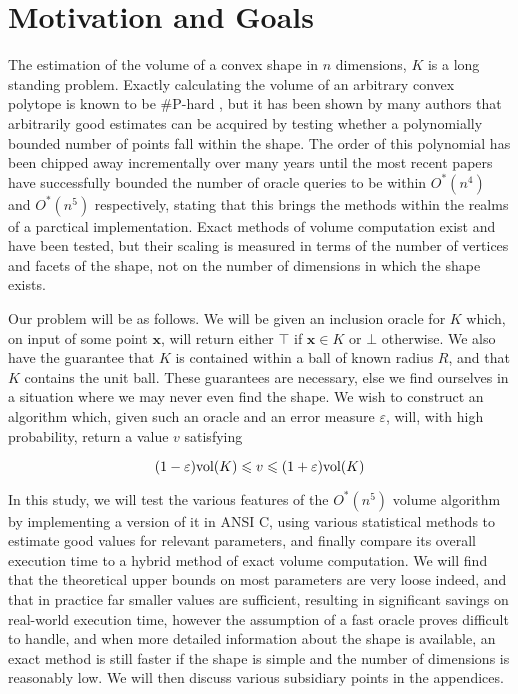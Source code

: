 \section{Motivation and Goals}

The estimation of the volume of a convex shape in $n$ dimensions, $K$ is a long standing problem. Exactly calculating the volume of an arbitrary convex polytope is known to be \#P-hard \cite{Dyer88}, but it has been shown by many authors \cite{Dyer95, Kannan97, Lovasz03}
that arbitrarily good estimates can be acquired by testing whether a polynomially bounded number of points fall within the shape. The order of this polynomial has been chipped away incrementally over many years until the most recent papers have successfully bounded the number of oracle queries to be within $O^{*}(n^4)$ and $O^{*}(n^5)$ respectively, stating that this brings the methods within the realms of a parctical implementation. Exact methods of volume computation exist and have been tested, but their scaling is measured in terms of the number of vertices and facets of the shape, not on the number of dimensions in which the shape exists. 

Our problem will be as follows. We will be given an inclusion oracle for $K$ which, on input of some point $\bm{x}$, will return either $\top$ if $\bm{x} \in K$ or $\bot$ otherwise. We also have the guarantee that $K$ is contained within a ball of known radius $R$, and that $K$ contains the unit ball. These guarantees are necessary, else we find ourselves in a situation where we may never even find the shape. We wish to construct an algorithm which, given such an oracle and an error measure $\varepsilon$, will, with high probability, return a value $v$ satisfying

$$
(1-\varepsilon)\mbox{vol}(K) \leqslant v \leqslant (1+\varepsilon)\mbox{vol}(K)
$$

In this study, we will test the various features of the $O^{*}(n^5)$ volume algorithm by implementing a version of it in ANSI C, using various statistical methods to estimate good values for relevant parameters, and finally compare its overall execution time to a hybrid method of exact volume computation\cite{Bueler98}. We will find that the theoretical upper bounds on most parameters are very loose indeed, and that in practice far smaller values are sufficient, resulting in significant savings on real-world execution time, however the assumption of a fast oracle proves difficult to handle, and when more detailed information about the shape is available, an exact method is still faster if the shape is simple and the number of dimensions is reasonably low. We will then discuss various subsidiary points in the appendices.

